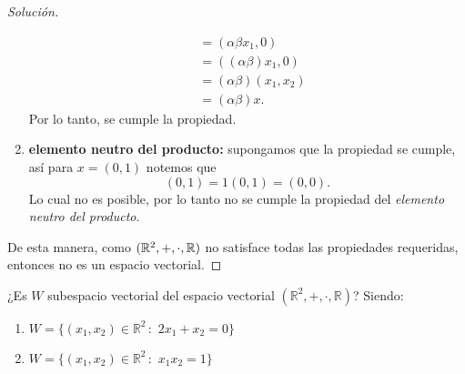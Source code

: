 \documentclass[a4,11pt]{aleph-notas}
\begin{document}
\begin{proof}[Solución]
\begin{enumerate}
\begin{align*}
                & = (\alpha \beta x_1,0)\\
                & = ((\alpha \beta) x_1,0)\\
                & = (\alpha \beta)(x_1,x_2)\\
                & = (\alpha \beta) x.
        \end{align*}
        Por lo tanto, se cumple la propiedad. 
    \item \textbf{elemento neutro del producto:} supongamos que la propiedad se cumple, así para $x=(0,1)$ notemos que 
    \[
        (0,1) = 1(0,1) = (0,0).
    \]
    Lo cual no es posible, por lo tanto no se cumple la propiedad del \emph{elemento neutro del producto}.
    \end{enumerate}
    De esta manera, como $(\mathbb{R}^2,+,\cdot,\mathbb{R})$ no satisface todas las propiedades requeridas, entonces no es un espacio vectorial. \qedhere
    
\end{proof}

\begin{ejer}\label{ejer:12}
    ¿Es $W$ subespacio vectorial del espacio vectorial $(\mathbb{R}^2, + , \cdot, \mathbb{R})$? Siendo:
\begin{enumerate}
    \item $W = \{(x_1, x_2) \in \mathbb{R}^2 \,:\, \, 2x_1 + x_2 = 0\}$
    
    \item $W = \{(x_1, x_2) \in \mathbb{R}^2 \,:\, \, x_1x_2 = 1\}$
\end{enumerate}
\end{ejer}
\end{document}
